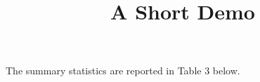 \documentclass[article]{jss}
\title{A Short Demo}
\begin{document}
The summary statistics are reported in Table 3 below.
\end{document}

